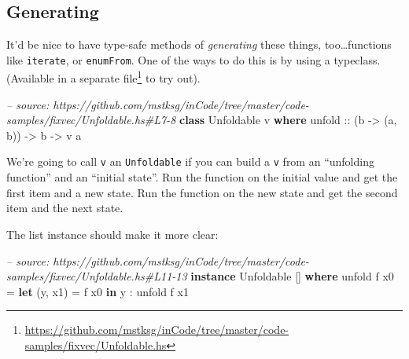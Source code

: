 \documentclass[]{article}
\newenvironment{Shaded}{}{}
\newcommand{\KeywordTok}[1]{\textcolor[rgb]{0.00,0.44,0.13}{\textbf{{#1}}}}
\newcommand{\DataTypeTok}[1]{\textcolor[rgb]{0.56,0.13,0.00}{{#1}}}
\newcommand{\DecValTok}[1]{\textcolor[rgb]{0.25,0.63,0.44}{{#1}}}
\newcommand{\CommentTok}[1]{\textcolor[rgb]{0.38,0.63,0.69}{\textit{{#1}}}}
\newcommand{\OtherTok}[1]{\textcolor[rgb]{0.00,0.44,0.13}{{#1}}}
\newcommand{\FunctionTok}[1]{\textcolor[rgb]{0.02,0.16,0.49}{{#1}}}
\newcommand{\NormalTok}[1]{{#1}}
\renewcommand{\href}[2]{#2\footnote{\url{#1}}}
\begin{document}
\subsection{Generating}\label{generating}

It'd be nice to have type-safe methods of \emph{generating} these
things, too\ldots{}functions like \texttt{iterate}, or
\texttt{enumFrom}. One of the ways to do this is by using a typeclass.
(Available in a
\href{https://github.com/mstksg/inCode/tree/master/code-samples/fixvec/Unfoldable.hs}{separate
file} to try out).

\begin{Shaded}
\begin{Highlighting}[]
\CommentTok{-- source: https://github.com/mstksg/inCode/tree/master/code-samples/fixvec/Unfoldable.hs#L7-8}
\KeywordTok{class} \DataTypeTok{Unfoldable} \NormalTok{v }\KeywordTok{where}
\OtherTok{    unfold ::} \NormalTok{(b }\OtherTok{->} \NormalTok{(a, b)) }\OtherTok{->} \NormalTok{b }\OtherTok{->} \NormalTok{v a}
\end{Highlighting}
\end{Shaded}

We're going to call \texttt{v} an \texttt{Unfoldable} if you can build a
\texttt{v} from an ``unfolding function'' and an ``initial state''. Run
the function on the initial value and get the first item and a new
state. Run the function on the new state and get the second item and the
next state.

The list instance should make it more clear:

\begin{Shaded}
\begin{Highlighting}[]
\CommentTok{-- source: https://github.com/mstksg/inCode/tree/master/code-samples/fixvec/Unfoldable.hs#L11-13}
\KeywordTok{instance} \DataTypeTok{Unfoldable} \NormalTok{[] }\KeywordTok{where}
    \NormalTok{unfold f x0 }\FunctionTok{=} \KeywordTok{let} \NormalTok{(y, x1) }\FunctionTok{=} \NormalTok{f x0}
                  \KeywordTok{in}  \NormalTok{y }\FunctionTok{:} \NormalTok{unfold f x1}
\end{Highlighting}
\end{Shaded}

\begin{Shaded}
\end{Shaded}
\end{document}
